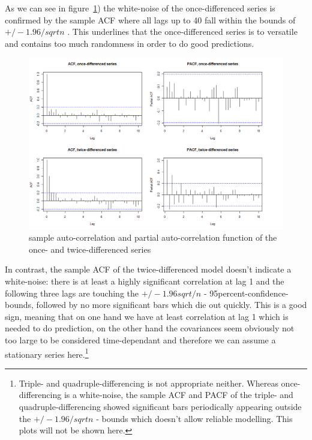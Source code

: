 \documentclass[11pt,a4paper]{article}
\begin{document}
As we can see in figure~\ref{fig:diff12_acf_pacf}) the white-noise of the once-differenced series is confirmed by the sample ACF where all lags up to 40 fall within the bounds of $+/-1.96/sqrt{n}$ \cite[p.~39]{bd02}. This underlines that the once-differenced series is to versatile and contains too much randomness in order to do good predictions.\\
\begin{figure}[!htb]
\centering
\includegraphics[angle=0,
width=1\textwidth]{diff12_acf_pacf}
\caption{sample auto-correlation and partial auto-correlation function of the once- and twice-differenced series
\label{fig:diff12_acf_pacf}}
\end{figure}
In contrast, the sample ACF of the twice-differenced model doesn't indicate a white-noise: there is at least a highly significant correlation at lag 1 and the following three lags are touching the $+/-1.96sqrt/{n}$ - 95percent-confidence-bounds, followed by no more significant bars which die out quickly. This is a good sign, meaning that on one hand we have at least correlation at lag 1 which is needed to do prediction, on the other hand the covariances seem obviously not too large to be considered time-dependant and therefore we can assume a stationary series here.\footnote{Triple- and quadruple-differencing is not appropriate neither. Whereas once-differencing is a white-noise, the sample ACF and PACF of the triple- and quadruple-differencing showed significant bars periodically appearing outside the $+/-1.96/sqrt{n}$ - bounds which doesn't allow reliable modelling. This plots will not be shown here.}\\
\end{document}
